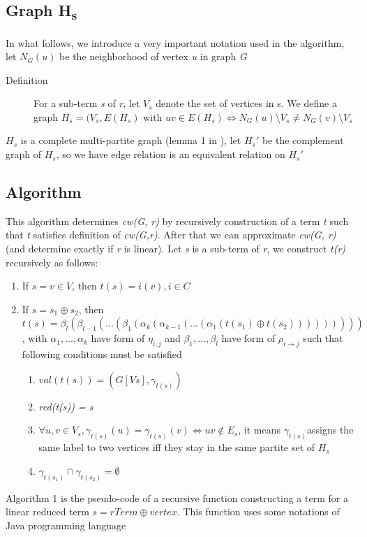 \documentclass[a4paper, 12pt]{article}
\begin{document}
\subsection {Graph H\textsubscript{s}}

In what follows, we introduce a very important notation used in the algorithm, let \textit {$N_{G}(u)$} be the neighborhood of vertex \textit {u} in graph \textit {G} 

\begin{description}
\item [{Definition}] \cite {vadim-lozin} For a sub-term \textit {s} of \textit {r}, let \textit {$V_{s}$} denote the set of vertices in s. We define a graph \textit {$H_{s}=(V_{s}, E(H_{s})$} with $uv\in E(H_{s})\Longleftrightarrow N_{G}(u)\setminus V_{s}\neq N_{G}(v)\setminus V_{s}$
\end{description}
\textit{$H_{s}$} is a complete multi-partite graph (lemma 1 in \cite{vadim-lozin}), let \textit{$H_{s}'$} be the complement graph of \textit{$H_{s}$}, so we have edge relation is an equivalent relation on \textit{$H_{s}'$}

\subsection{Algorithm}

This algorithm determines \textit {cw(G, r)} by recursively construction of a term \textit {t} such that \textit {t} satisfies definition of \textit {cw(G,r)}. After that we can approximate \textit {cw(G, r)} (and determine exactly if  \textit {r} is linear). Let \textit {s} is a sub-term of \textit {r}, we construct \textit {t(r)} recursively as follows:

\begin{enumerate}
\item If $s=v\in V$, then $t(s)=i(v),i\in C$ 
\item If $s=s_{1}\oplus s_{2}$, then $t(s)=\beta_{l}(\beta_{l-1}(...(\beta_{1}(\alpha_{k}(\alpha_{k-1}(...(\alpha_{1}(t(s_{1})\oplus t(s_{2})))))))))$, with \textit {$\alpha_{1},...,\alpha_{k}$} have form of $\eta_{i,j}$ and \textit {$\beta_{1},...,\beta_{l}$} have form of $\rho_{i\rightarrow j}$ such that following conditions must be satisfied

\begin{enumerate}
\item \textit {$val(t(s))=(G[Vs],\gamma_{t(s)})$} 
\item \textit {red(t(s)) = s} 
\item $\forall u,v\in V_{s},\gamma_{t(s)}(u)=\gamma_{t(s)}(v)\Leftrightarrow uv\notin E_{s}$,
it means \textit {$\gamma_{t(s)}$}assigns the same label to two vertices iff they stay in the same partite set of \textit {$H_{s}$} 
\item \textit {$\gamma_{t(s_{1})}\cap\gamma_{t(s_{2})}=\emptyset$} \end{enumerate}
\end{enumerate}
Algorithm 1 is the pseudo-code of a recursive function constructing a term for a linear reduced term {$s=rTerm\oplus vertex$}. This function uses some notations of Java programming language
\end{document}
